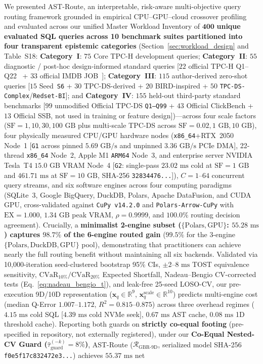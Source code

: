 \documentclass[10pt,a4paper]{article}
\begin{document}
We presented AST-Route, an interpretable, risk-aware multi-objective query routing framework grounded in empirical CPU--GPU--cloud crossover profiling and evaluated across our unified Master Workload Inventory of $\mathbf{400}$ \textbf{unique evaluated SQL queries across 10 benchmark suites partitioned into four transparent epistemic categories} (Section~\ref{sec:workload_design} and Table~S18: \textbf{Category~I}: $75$ Core TPC-H development queries; \textbf{Category~II}: $55$ diagnostic / post-hoc design-informed standard queries [$22$ official TPC-H Q1--Q22~\cite{tpc2022tpch} + $33$ official IMDB JOB~\cite{leis2015job}]; \textbf{Category~III}: $115$ author-derived zero-shot queries [$15$ Seed~\texttt{S6} + $30$ TPC-DS-derived + $20$ BIRD-inspired + $50$ \texttt{TPC-DS-Complex}/\texttt{Redset-BI}]; and \textbf{Category~IV}: $155$ held-out third-party standard benchmarks [$99$ unmodified Official TPC-DS \texttt{Q1--Q99} + $43$ Official ClickBench + $13$ Official SSB, not used in training or feature design])---across four scale factors ($\text{SF}=1, 10, 30, 100\text{ GB}$ plus multi-scale TPC-DS across $\text{SF}=0.02, 1\text{ GB}, 10\text{ GB}$), four physically measured CPU/GPU hardware nodes (\texttt{x86\_64}+RTX~2050 Node~1 [\texttt{G1} across pinned $5.69\text{ GB/s}$ and unpinned $3.36\text{ GB/s}$ PCIe DMA], 22-thread \texttt{x86\_64} Node~2, Apple M1 \texttt{ARM64} Node~3, and enterprise server NVIDIA Tesla~T4 $15.0\text{ GB}$ VRAM Node~4 [\texttt{G2}: single-pass $23.02\text{ ms}$ cold at $\text{SF}=1\text{ GB}$ and $461.71\text{ ms}$ at $\text{SF}=10\text{ GB}$, SHA-256 \texttt{32834476...}]), $C=1\text{--}64$ concurrent query streams, and six software engines across four computing paradigms (SQLite~3, Google BigQuery, DuckDB, Polars, Apache DataFusion, and CUDA GPU, cross-validated against \texttt{CuPy v14.2.0} and \texttt{Polars-Arrow-CuPy} with $\text{EX}=1.000$, $1.34\text{ GB}$ peak VRAM, $\rho=0.9999$, and $100.0\%$ routing decision agreement). Crucially, a \textbf{minimalist 2-engine subset ($\{\text{Polars}, \text{GPU}\}$: $55.28\text{ ms}$) captures $98.7\%$ of the 6-engine routed gain} ($99.5\%$ for the 3-engine $\{\text{Polars}, \text{DuckDB}, \text{GPU}\}$ pool), demonstrating that practitioners can achieve nearly the full routing benefit without maintaining all six backends. Validated via 10,000-iteration seed-clustered bootstrap 95\% CIs, $\pm 2\text{--}8\text{ ms}$ TOST equivalence sensitivity, $\text{CVaR}_{10\%}/\text{CVaR}_{20\%}$ Expected Shortfall, Nadeau--Bengio CV-corrected tests (Eq.~\ref{eq:nadeau_bengio_t}), and leak-free 25-seed LOSO-CV, our pre-execution 9D/10D representation ($\mathbf{x}_q\in\mathbb{R}^9$, $\mathbf{x}_q^{\text{scale}}\in\mathbb{R}^{10}$) predicts multi-engine cost (median Q-Error $1.007\text{--}1.172$, $R^2=0.815\text{--}0.875$) across three overhead regimes ($4.15\text{ ms}$ cold SQL [$4.39\text{ ms}$ cold NVMe seek], $0.67\text{ ms}$ AST cache, $0.08\text{ ms}$ 1D threshold cache). Reporting both guards on \textbf{strictly co-equal footing} (pre-specified in repository, not externally registered), under our \textbf{Co-Equal Nested-CV Guard ($\hat{\tau}_{\text{guard}}^{(-k)}=8\%$)}, AST-Route ($\mathcal{R}_{\text{GBR-9D}}$, serialized model SHA-256 \texttt{f0e5f17c832472e3...}) achieves $55.37\text{ ms}$ net 
\end{document}
